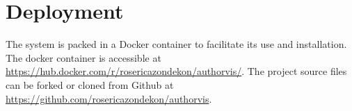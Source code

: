 \section{Deployment}
The system is packed in a Docker container to facilitate its use and installation. The docker container is accessible at \url{https://hub.docker.com/r/rosericazondekon/authorvis/}. The project source files can be forked or cloned from Github at \url{https://github.com/rosericazondekon/authorvis}. %



